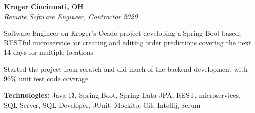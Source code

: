 %
    \headerrow
        {\textbf{\href{https://www.kroger.com/}{Kroger}}}
        {\textbf{Cincinnati, OH}}
    \\
    \headerrow
        {\emph{Remote Software Engineer, Contractor}}
        {\emph{2020}}
    \begin{itemize*}
        \item Software Engineer on Kroger's Ocado project developing a Spring Boot based, RESTful microservice for creating and editing
            order predictions covering the next 14 days for multiple locations
        \item Started the project from scratch and did much of the backend development with 96\% unit test code coverage
    \end{itemize*}

    \hspace{1.0em}
        {\textbf{Technologies:} Java 13, Spring Boot, Spring Data JPA, REST, microservices, SQL Server, SQL Developer, JUnit, Mockito,
            Git, Intellij, Scrum}

